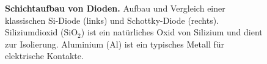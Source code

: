 {%

\begin{figure}[H]
    \centering
    \begin{minipage}[c]{0.49\textwidth}
        \centering
        
    \end{minipage}
    \begin{minipage}[c]{0.49\textwidth}
        \centering
        
    \end{minipage}
    
    \label{fig:SchichtaufbauVonDioden}
    \caption{\textbf{Schichtaufbau von Dioden.} Aufbau und Vergleich einer klassischen Si-Diode (links)
        und Schottky-Diode (rechts). Siliziumdioxid ($\mathrm{SiO_2}$) ist ein natürliches Oxid von Silizium und dient zur Isolierung. Aluminium (Al) ist ein typisches Metall für elektrische Kontakte.}
\end{figure}
}
